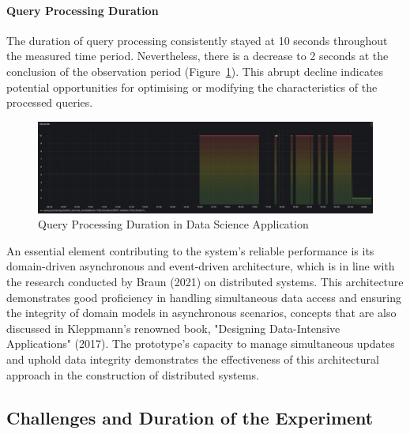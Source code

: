 \documentclass{ieeeaccess}
\begin{document}
\paragraph{Query Processing Duration}

The duration of query processing consistently stayed at 10 seconds throughout the measured time period. Nevertheless, there is a decrease to 2 seconds at the conclusion of the observation period (Figure~\ref{queryProcessingDurationInDataScienceApplication}). This abrupt decline indicates potential opportunities for optimising or modifying the characteristics of the processed queries.

\begin{figure}[h]

  \centering

  \includegraphics[width=\textwidth]{images/query-processing-duration-in-data-science-application.png}

  \caption{Query Processing Duration in Data Science Application}

  \label{queryProcessingDurationInDataScienceApplication}

\end{figure}

An essential element contributing to the system's reliable performance is its domain-driven asynchronous and event-driven architecture, which is in line with the research conducted by Braun (2021) on distributed systems. This architecture demonstrates good proficiency in handling simultaneous data access and ensuring the integrity of domain models in asynchronous scenarios, concepts that are also discussed in Kleppmann's renowned book, "Designing Data-Intensive Applications" (2017). The prototype's capacity to manage simultaneous updates and uphold data integrity demonstrates the effectiveness of this architectural approach in the construction of distributed systems.

\subsection{Challenges and Duration of the Experiment}
\end{document}
